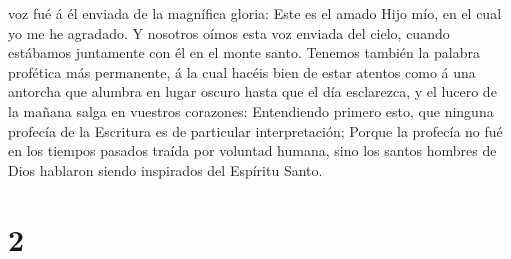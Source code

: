 voz fué á él enviada de la magnífica gloria: Este es el amado Hijo mío,
en el cual yo me he agradado.  Y nosotros oímos esta voz
enviada del cielo, cuando estábamos juntamente con él en el monte santo.
 Tenemos también la palabra profética más permanente, á la
cual hacéis bien de estar atentos como á una antorcha que alumbra en
lugar oscuro hasta que el día esclarezca, y el lucero de la mañana salga
en vuestros corazones:  Entendiendo primero esto, que
ninguna profecía de la Escritura es de particular interpretación;
 Porque la profecía no fué en los tiempos pasados traída
por voluntad humana, sino los santos hombres de Dios hablaron siendo
inspirados del Espíritu Santo.

\hypertarget{section-1}{%
\section{2}\label{section-1}}

